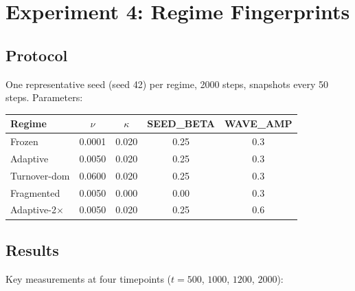\documentclass[11pt]{article}
\theoremstyle{remark}
\begin{document}
\section{Experiment 4: Regime Fingerprints}

\subsection{Protocol}

One representative seed (seed 42) per regime, 2000 steps, snapshots every 50
steps. Parameters:

\begin{center}
\begin{tabular}{lcccc}
\toprule
Regime     & $\nu$  & $\kappa$ & SEED\_BETA & WAVE\_AMP \\
\midrule
Frozen       & 0.0001 & 0.020 & 0.25 & 0.3 \\
Adaptive     & 0.0050 & 0.020 & 0.25 & 0.3 \\
Turnover-dom & 0.0600 & 0.020 & 0.25 & 0.3 \\
Fragmented   & 0.0050 & 0.000 & 0.00 & 0.3 \\
Adaptive-2$\times$ & 0.0050 & 0.020 & 0.25 & 0.6 \\
\bottomrule
\end{tabular}
\end{center}

\subsection{Results}

Key measurements at four timepoints ($t = 500$, $1000$, $1200$, $2000$):
\end{document}
